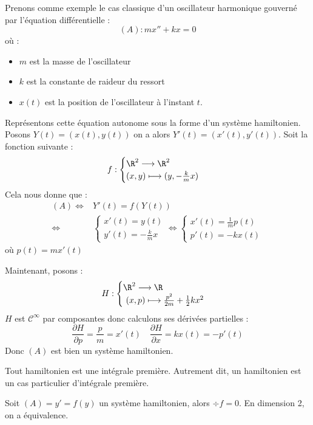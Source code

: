 \begin{example}
    Prenons comme exemple le cas classique d'un oscillateur harmonique gouverné par l'équation 
    différentielle : 
        \[ (A) : m x'' + kx = 0 \] 
    où : 
    \begin{itemize}
        \item $m$ est la masse de l'oscillateur 
        \item $k$ est la constante de raideur du ressort 
        \item $x(t)$ est la position de l'oscillateur à l'instant $t$. 
    \end{itemize}
    Représentons cette équation autonome sous la forme d'un système hamiltonien. 
    Posons $Y(t) = (x(t), y(t))$ on a alors $Y'(t) = (x'(t), y'(t))$. Soit la fonction suivante : 
    \[ f : 
        \begin{cases}
            \R^2 \longrightarrow \R^2 \\ 
            (x,y) \longmapsto (y, - \frac{k}{m}x)
        \end{cases} \] 
    Cela nous donne que : 
        \begin{align*}
            (A) \iff & Y'(t) = f(Y(t)) \\ 
            \iff & 
                \begin{cases}
                    x'(t) = y(t) \\ 
                    y'(t) = - \frac{k}{m} x 
                \end{cases} 
            \iff  
                \begin{cases}
                    x'(t) = \frac{1}{m} p(t) \\ 
                    p'(t) = -kx(t) 
                \end{cases}
        \end{align*}
        où $ p(t) = m x'(t)$ 
    
    Maintenant, posons : 
        \[ H : 
            \begin{cases}
                \R^2 \longrightarrow \R \\ 
                (x,p) \longmapsto \frac{p^2}{2m} + \frac{1}{2} k x^2 
            \end{cases} \] 
    $H$ est $ \mathcal{C}^\infty$ par composantes donc calculons ses dérivées partielles : 
        \[ \frac{\partial H}{\partial p} = \frac{p}{m} = x'(t) \quad \frac{\partial H}{\partial x} = k x(t) = - p'(t) \] 
    Donc $(A)$ est bien un système hamiltonien. 
\end{example}

\begin{prop}
    Tout hamiltonien est une intégrale première. Autrement dit, un hamiltonien est un cas particulier d'intégrale première. 
\end{prop}

\begin{proposition}
    Soit $(A) = y' = f(y)$ un système hamiltonien, alors $ \div f = 0 $. 
    En dimension 2, on a équivalence. 
\end{proposition}




